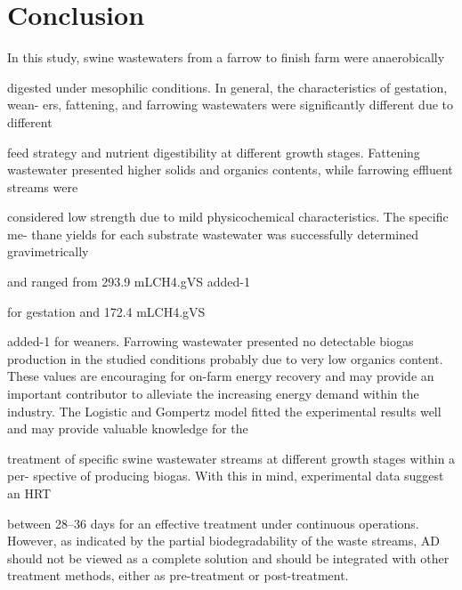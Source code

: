 \section{Conclusion}
In this study, swine wastewaters from a farrow to finish farm were anaerobically

digested under mesophilic conditions. In general, the characteristics of gestation, wean-
ers, fattening, and farrowing wastewaters were significantly different due to different

feed strategy and nutrient digestibility at different growth stages. Fattening wastewater
presented higher solids and organics contents, while farrowing effluent streams were

considered low strength due to mild physicochemical characteristics. The specific me-
thane yields for each substrate wastewater was successfully determined gravimetrically

and ranged from 293.9 mLCH4.gVS added-1

for gestation and 172.4 mLCH4.gVS

added-1
for weaners. Farrowing wastewater presented no detectable biogas production
in the studied conditions probably due to very low organics content. These values are
encouraging for on-farm energy recovery and may provide an important contributor to
alleviate the increasing energy demand within the industry. The Logistic and Gompertz
model fitted the experimental results well and may provide valuable knowledge for the

treatment of specific swine wastewater streams at different growth stages within a per-
spective of producing biogas. With this in mind, experimental data suggest an HRT

between 28–36 days for an effective treatment under continuous operations. However,
as indicated by the partial biodegradability of the waste streams, AD should not be
viewed as a complete solution and should be integrated with other treatment methods,
either as pre-treatment or post-treatment.
